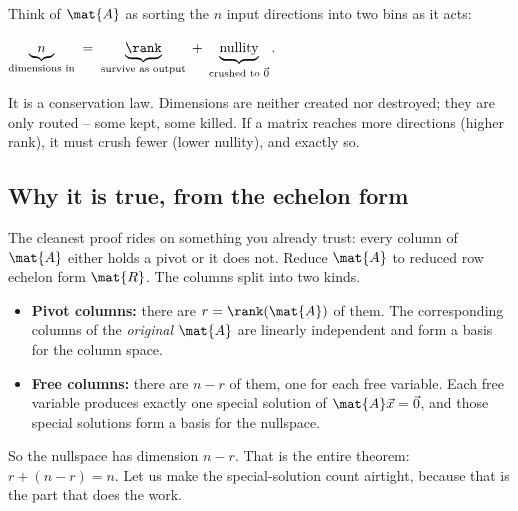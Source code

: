 \begin{intuitionbox}
Think of $\mat{A}$ as sorting the $n$ input directions into two bins as it acts:
\begin{center}
$\underbrace{n}_{\text{dimensions in}} \;=\;
 \underbrace{\rank}_{\text{survive as output}} \;+\;
 \underbrace{\text{nullity}}_{\text{crushed to }\vec 0}.$
\end{center}
It is a conservation law. Dimensions are neither created nor destroyed; they are
only routed -- some kept, some killed. If a matrix reaches more directions (higher
rank), it must crush fewer (lower nullity), and exactly so.
\end{intuitionbox}

\subsection{Why it is true, from the echelon form}

The cleanest proof rides on something you already trust: every column of $\mat{A}$
either holds a pivot or it does not. Reduce $\mat{A}$ to reduced row echelon form
$\mat{R}$. The columns split into two kinds.

\begin{itemize}
  \item \textbf{Pivot columns:} there are $r = \rank(\mat{A})$ of them. The
        corresponding columns of the \emph{original} $\mat{A}$ are linearly
        independent and form a basis for the column space.
  \item \textbf{Free columns:} there are $n - r$ of them, one for each free
        variable. Each free variable produces exactly one special solution of
        $\mat{A}\vec{x} = \vec{0}$, and those special solutions form a basis for
        the nullspace.
\end{itemize}

So the nullspace has dimension $n - r$. That is the entire theorem:
$r + (n - r) = n$. Let us make the special-solution count airtight, because that
is the part that does the work.

